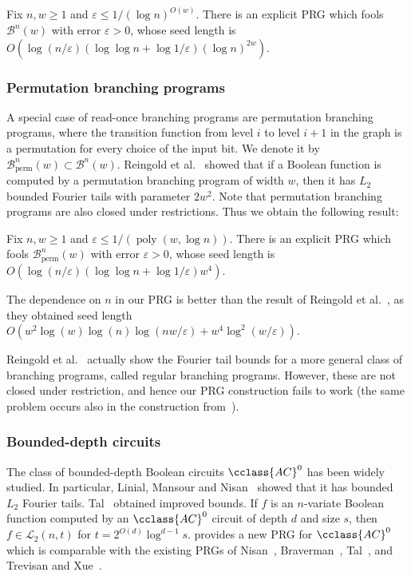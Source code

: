 \documentclass{toc}
\newcommand{\LL}{\mathcal{L}}
\newcommand{\BB}{\mathcal{B}}
\DeclareMathOperator{\perm}{perm}           %
\newcommand{\BBperm}{\mathcal{B}_{\perm}}    %
\newcommand{\eps}{\varepsilon}
\DeclareMathOperator{\poly}{poly}      %
\begin{document}
\begin{corollary}
\label{cor:ROBP}
	Fix $n,w \ge 1$ and $\eps\leq 1/(\log n)^{O(w)}$. There is an explicit PRG which fools $\BB^n(w)$ with error $\eps>0$,
whose seed length is $O(\log (n/\eps) (\log \log n + \log 1/\eps) (\log n)^{2w})$.
\end{corollary}


\subsubsection{Permutation branching programs}
A special case of read-once branching programs are permutation branching programs, where the transition function from level $i$
to level $i+1$ in the graph is a permutation for every choice of the input bit. We denote it by $\BBperm^n(w) \subset \BB^n(w)$.
Reingold {et al.}~\cite{reingold2013pseudorandomness} showed that if a Boolean function
is computed by a permutation branching program of width $w$, then it has $L_2$ bounded Fourier tails with parameter $2 w^2$.
Note that permutation branching programs are also closed under restrictions. Thus we obtain the following result:

\begin{corollary}
\label{cor:perm_BP}
	Fix $n,w \ge 1$ and $\eps\leq 1/(\poly(w, \log n))$. There is an explicit PRG which fools $\BBperm^n(w)$ with error $\eps>0$,
whose seed length is $O(\log (n/\eps) (\log \log n + \log 1/\eps) w^4)$.
\end{corollary}
%
%
The dependence on $n$ in our PRG is better than the result of Reingold et al.~\cite{reingold2013pseudorandomness},
as they obtained seed length $O(w^2 \log(w) \log(n) \log(nw/\eps) + w^4 \log^2(w/\eps))$.

%
%
Reingold et al.~\cite{reingold2013pseudorandomness} actually show the Fourier tail bounds for a more general
class of branching programs, called regular branching programs. However, these are not closed under restriction,
%
%
and hence our PRG construction fails to work (the same problem occurs also in the construction from~\cite{reingold2013pseudorandomness}).

%
\subsubsection{Bounded-depth circuits}   %
The class of bounded-depth Boolean circuits $\cclass{AC}^0$ has been widely studied. In particular, Linial, Mansour and Nisan~\cite{linial1993constant} showed that it has bounded $L_2$ Fourier tails. Tal~\cite{tal2017tight} obtained improved
bounds. If $f$ is an $n$-variate Boolean function computed by an $\cclass{AC}^0$ circuit of depth $d$ and size $s$,
then $f \in \LL_2(n,t)$ for $t=2^{O(d)}\log^{d-1}s$.  provides a new PRG for $\cclass{AC}^0$ which is comparable
with the existing PRGs of Nisan~\cite{nisan1991pseudorandom}, Braverman~\cite{braverman2010polylogarithmic}, Tal~\cite{tal2017tight}, and Trevisan and Xue~\cite{trevisan2013derandomized}.
\end{document}
